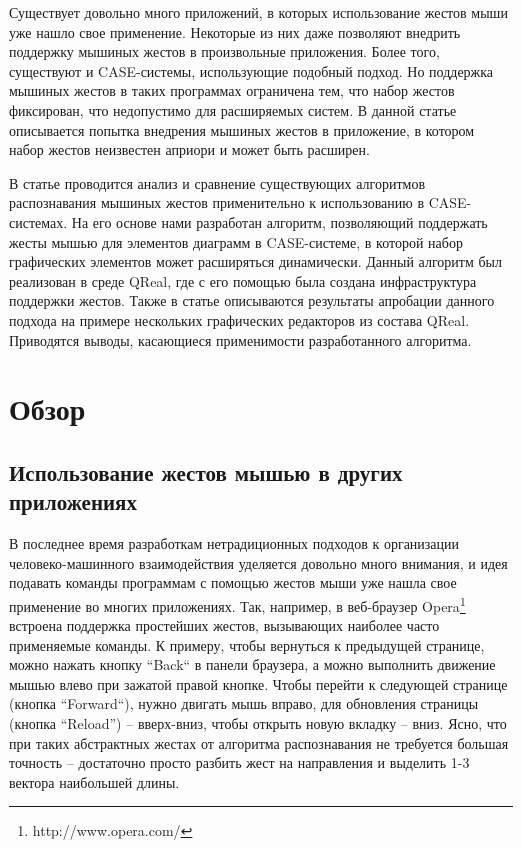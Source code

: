 \documentclass[a5paper]{article}
\begin{document}
Существует довольно много приложений, в которых использование жестов мыши уже нашло свое применение. Некоторые из них даже позволяют внедрить поддержку мышиных жестов в произвольные приложения. Более того, существуют и CASE-системы, использующие подобный подход. Но поддержка мышиных жестов в таких программах ограничена тем, что набор жестов фиксирован, что недопустимо для расширяемых систем. В данной статье описывается попытка внедрения мышиных жестов в приложение, в котором набор жестов неизвестен априори и может быть расширен.

В статье проводится анализ и сравнение существующих алгоритмов распознавания мышиных жестов применительно к использованию в CASE-системах. На его основе нами разработан алгоритм, позволяющий поддержать жесты мышью для элементов диаграмм в CASE-системе, в которой набор графических элементов может расширяться динамически. Данный алгоритм был реализован в среде QReal, где с его помощью была создана инфраструктура поддержки жестов. Также в статье описываются результаты апробации данного подхода на примере нескольких графических редакторов из состава QReal. Приводятся выводы, касающиеся применимости разработанного алгоритма.

\section{Обзор}

\subsection{Использование жестов мышью в других приложениях}

В последнее время разработкам нетрадиционных подходов к организации человеко-машинного взаимодействия уделяется довольно много внимания, и идея подавать команды программам с помощью жестов мыши уже нашла свое применение во многих приложениях. Так, например, в веб-браузер Opera\footnote{http://www.opera.com/} встроена поддержка простейших жестов, вызывающих наиболее часто применяемые команды. К примеру, чтобы вернуться к предыдущей странице, можно нажать кнопку ``Back`` в панели браузера, а можно выполнить движение мышью влево при зажатой правой кнопке. Чтобы перейти к следующей странице (кнопка ``Forward``), нужно двигать мышь вправо, для обновления страницы (кнопка ``Reload'') -- вверх-вниз, чтобы открыть новую вкладку -- вниз. Ясно, что при таких абстрактных жестах от алгоритма распознавания не требуется большая точность -- достаточно просто разбить жест на направления и выделить 1-3 вектора наибольшей длины.
\end{document}
